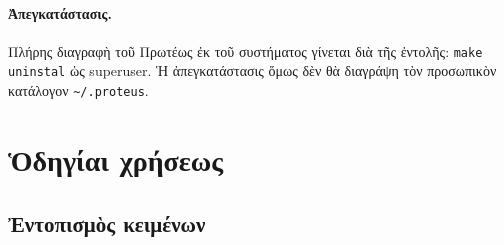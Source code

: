 \documentclass[12pt,a4paper]{article}
\begin{document}
    \paragraph{Ἀπεγκατάστασις.}
      Πλήρης διαγραφὴ τοῦ Πρωτέως ἐκ τοῦ συστήματος γίνεται διὰ τῆς ἐντολῆς:
      {\tt make uninstal} ὡς superuser.  Ἡ ἀπεγκατάστασις ὅμως δὲν θὰ
      διαγράψη τὸν προσωπικὸν κατάλογον {\tt \~{}/.proteus}.
\section{Ὁδηγίαι χρήσεως}
  \subsection{Ἐντοπισμὸς κειμένων}
\end{document}
